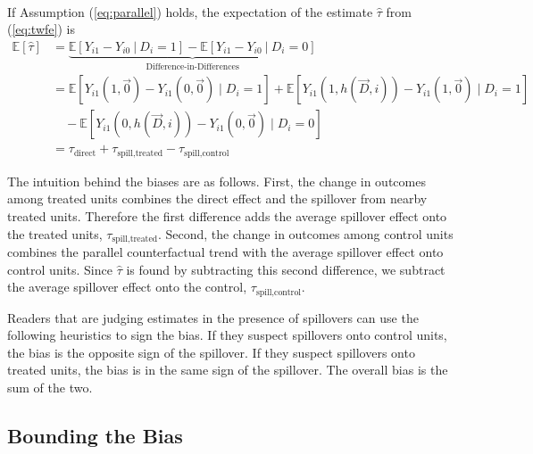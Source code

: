 \documentclass[11pt]{article}
\begin{document}
\begin{theorem}\label{thm:bias}\ \\    
    If Assumption (\ref{eq:parallel}) holds, the expectation of the estimate $\hat{\tau}$ from (\ref{eq:twfe}) is
    \begin{align*}
        \mathbb{E}[\hat{\tau}] &= \underbrace{\mathbb{E}\left[ Y_{i1} - Y_{i0} \ \vert \ D_i = 1 \right] - \mathbb{E}\left[ Y_{i1} - Y_{i0} \ \vert \ D_i = 0 \right]}_{\text{Difference-in-Differences}} \\ 
        &= 
        \mathbb{E} \left[ Y_{i1}(1, \vec{0}) - Y_{i1}(0, \vec{0}) \mid D_i = 1 \right] + \mathbb{E} \left[ Y_{i1}(1, h(\vec{D}, i)) - Y_{i1}(1, \vec{0}) \mid D_i = 1 \right] \\
        &\quad - \mathbb{E} \left[ Y_{i1}(0, h(\vec{D}, i)) - Y_{i1}(0, \vec{0}) \mid D_i = 0 \right] \\
        &= \tau_{\text{direct}} + \tau_{\text{spill,treated}} - \tau_{\text{spill,control}}
    \end{align*}
\end{theorem}

The intuition behind the biases are as follows. First, the change in outcomes among treated units combines the direct effect and the spillover from nearby treated units. Therefore the first difference adds the average spillover effect onto the treated units, $\tau_{\text{spill,treated}}$. Second, the change in outcomes among control units combines the parallel counterfactual trend with the average spillover effect onto control units. Since $\hat{\tau}$ is found by subtracting this second difference, we subtract the average spillover effect onto the control, $\tau_{\text{spill,control}}$. 

Readers that are judging estimates in the presence of spillovers can use the following heuristics to sign the bias. If they suspect spillovers onto control units, the bias is the opposite sign of the spillover. If they suspect spillovers onto treated units, the bias is in the same sign of the spillover. The overall bias is the sum of the two.



\subsection{Bounding the Bias}
\end{document}
